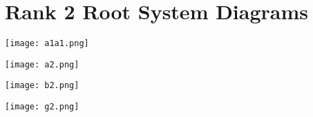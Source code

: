 
\chapter{Rank 2 Root System Diagrams}
\label{AppendixC}

\begin{center}
	\texttt{[image: a1a1.png]}
\end{center}

\begin{center}
	\texttt{[image: a2.png]}
\end{center}

\begin{center}
	\texttt{[image: b2.png]}
\end{center}

\begin{center}
	\texttt{[image: g2.png]}
\end{center}
